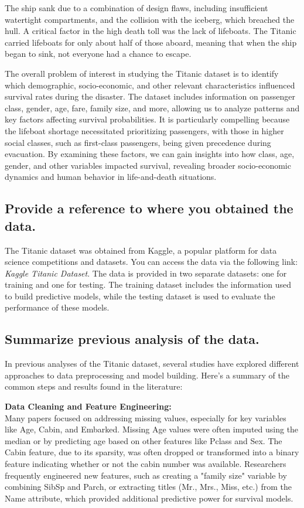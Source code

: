 \documentclass[twoside,11pt]{article}
\begin{document}
The ship sank due to a combination of design flaws, including insufficient watertight compartments, and the collision with the iceberg, which breached the hull. A critical factor in the high death toll was the lack of lifeboats. The Titanic carried lifeboats for only about half of those aboard, meaning that when the ship began to sink, not everyone had a chance to escape.

The overall problem of interest in studying the Titanic dataset is to identify which demographic, socio-economic, and other relevant characteristics influenced survival rates during the disaster. The dataset includes information on passenger class, gender, age, fare, family size, and more, allowing us to analyze patterns and key factors affecting survival probabilities. It is particularly compelling because the lifeboat shortage necessitated prioritizing passengers, with those in higher social classes, such as first-class passengers, being given precedence during evacuation. By examining these factors, we can gain insights into how class, age, gender, and other variables impacted survival, revealing broader socio-economic dynamics and human behavior in life-and-death situations.

\subsection*{Provide a reference to where you obtained the data.}
The Titanic dataset was obtained from Kaggle, a popular platform for data science competitions and datasets. You can access the data via the following link: \textit{Kaggle Titanic Dataset}. The data is provided in two separate datasets: one for training and one for testing. The training dataset includes the information used to build predictive models, while the testing dataset is used to evaluate the performance of these models.

\subsection*{Summarize previous analysis of the data.}
In previous analyses of the Titanic dataset, several studies have explored different approaches to data preprocessing and model building. Here’s a summary of the common steps and results found in the literature:

\textbf{Data Cleaning and Feature Engineering:} \\
Many papers focused on addressing missing values, especially for key variables like Age, Cabin, and Embarked. Missing Age values were often imputed using the median or by predicting age based on other features like Pclass and Sex. The Cabin feature, due to its sparsity, was often dropped or transformed into a binary feature indicating whether or not the cabin number was available. Researchers frequently engineered new features, such as creating a "family size" variable by combining SibSp and Parch, or extracting titles (Mr., Mrs., Miss, etc.) from the Name attribute, which provided additional predictive power for survival models.
\end{document}
